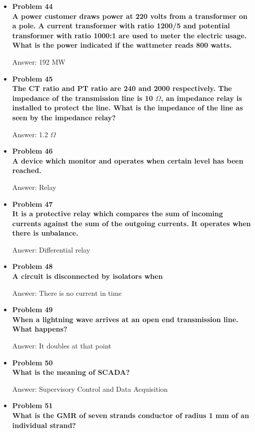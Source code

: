 \documentclass{article}
\begin{document}
\begin{center}
\begin{itemize}
    \item\textbf{Problem 44\\
    A power customer draws power at 220 volts from a transformer on a pole. A current transformer with ratio 1200/5 and potential transformer with ratio 1000:1 are used to meter the electric usage. What is the power indicated if the wattmeter reads 800 watts.}

    Answer: 192 MW

    \item\textbf{Problem 45\\
    The CT ratio and PT ratio are 240 and 2000 respectively. The impedance of the transmission line is 10 $\Omega$, an impedance relay is installed to protect the line. What is the impedance of the line as seen by the impedance relay?}

    Answer: 1.2 $\Omega$

    \item\textbf{Problem 46\\
    A device which monitor and operates when certain level has been reached.}

    Answer: Relay

    \item\textbf{Problem 47\\
    It is a protective relay which compares the sum of incoming currents against the sum of the outgoing currents. It operates when there is unbalance.}

    Answer: Differential relay

    \item\textbf{Problem 48\\
    A circuit is disconnected by isolators when}

    Answer: There is no current in time

    \item\textbf{Problem 49\\
    When a lightning wave arrives at an open end transmission line. What happens?}

    Answer: It doubles at that point

    \item\textbf{Problem 50\\
    What is the meaning of SCADA?}

    Answer: Supervisory Control and Data Acquisition

    \item\textbf{Problem 51\\%
    What is the GMR of seven strands conductor of radius 1 mm of an individual strand?}


\end{itemize}
\end{center}
\end{document}
